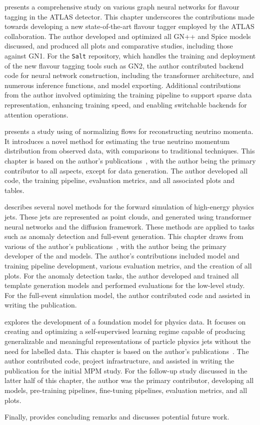  presents a comprehensive study on various graph neural networks for flavour tagging in the ATLAS detector.
This chapter underscores the contributions made towards developing a new state-of-the-art flavour tagger employed by the ATLAS collaboration.
The author developed and optimized all GN++ and Spice models discussed, and produced all plots and comparative studies, including those against GN1.
For the \texttt{Salt} repository, which handles the training and deployment of the new flavour tagging tools such as GN2, the author contributed backend code for neural network construction, including the transformer architecture, and numerous inference functions, and model exporting.
Additional contributions from the author involved optimizing the training pipeline to support sparse data representation, enhancing training speed, and enabling switchable backends for attention operations.

 presents a study using of normalizing flows for reconstructing neutrino momenta.
It introduces a novel method for estimating the true neutrino momentum distribution from observed data, with comparisons to traditional techniques.
This chapter is based on the author's publications~\cite{Nu2Flows,NuFlows1}, with the author being the primary contributor to all aspects, except for data generation.
The author developed all code, the training pipeline, evaluation metrics, and all associated plots and tables.

 describes several novel methods for the forward simulation of high-energy physics jets.
These jets are represented as point clouds, and generated using transformer neural networks and the diffusion framework.
These methods are applied to tasks such as anomaly detection and full-event generation.
This chapter draws from various of the author's publications~\cite{PCJedi,PCDroid,EpicJedi,Drapes,PIPPIN}, with the author being the primary developer of the \pcjedi and \pcdroid models.
The author's contributions included model and training pipeline development, various evaluation metrics, and the creation of all plots.
For the anomaly detection tasks, the author developed and trained all template generation models and performed evaluations for the low-level study.
For the full-event simulation model, the author contributed code and assisted in writing the publication.

 explores the development of a foundation model for physics data.
It focuses on creating and optimizing a self-supervised learning regime capable of producing generalizable and meaningful representations of particle physics jets without the need for labelled data.
This chapter is based on the author's publications~\cite{MPM,MPM2}.
The author contributed code, project infrastructure, and assisted in writing the publication for the initial MPM study.
For the follow-up study discussed in the latter half of this chapter, the author was the primary contributor, developing all models, pre-training pipelines, fine-tuning pipelines, evaluation metrics, and all plots.

Finally,  provides concluding remarks and discusses potential future work.
